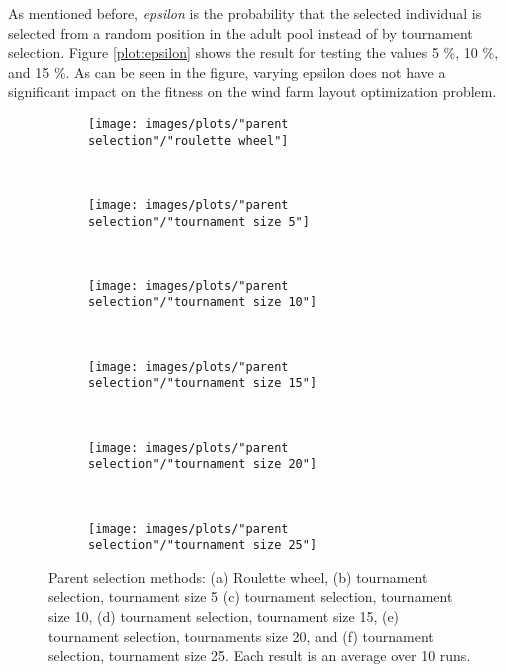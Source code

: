 \noindent As mentioned before, \textit{epsilon} is the probability that the selected individual is selected from a random position in the adult pool instead of by tournament selection. Figure \ref{plot:epsilon} shows the result for testing the values 5 \%, 10 \%, and 15 \%. As can be seen in the figure, varying epsilon does not have a significant impact on the fitness on the wind farm layout optimization problem.\\


\begin{figure}[h!]
    \centering
    \begin{subfigure}[b]{0.31\textwidth}
        \texttt{[image: images/plots/"parent selection"/"roulette wheel"]}
        \caption{}
        \hfill
        \label{plot:roulette wheel}
    \end{subfigure}
    ~
    \begin{subfigure}[b]{0.31\textwidth}
        \texttt{[image: images/plots/"parent selection"/"tournament size 5"]}
        \caption{}
        \hfill
        \label{plot:tournament size 5}
    \end{subfigure}
    ~
       \begin{subfigure}[b]{0.31\textwidth}
        \texttt{[image: images/plots/"parent selection"/"tournament size 10"]}
        \caption{}
        \hfill
        \label{plot:tournament size 10}
    \end{subfigure}
    ~
       \begin{subfigure}[b]{0.31\textwidth}
        \texttt{[image: images/plots/"parent selection"/"tournament size 15"]}
        \caption{}
        \hfill
        \label{plot:tournament size 15}
    \end{subfigure}
    ~
       \begin{subfigure}[b]{0.31\textwidth}
        \texttt{[image: images/plots/"parent selection"/"tournament size 20"]}
        \caption{}
        \hfill
        \label{plot:tournament size 20}
    \end{subfigure}
    ~
    \begin{subfigure}[b]{0.31\textwidth}
        \texttt{[image: images/plots/"parent selection"/"tournament size 25"]}
        \caption{}
        \hfill
        \label{plot:tournament size 25}
    \end{subfigure}
    \caption{Parent selection methods: (a) Roulette wheel, (b) tournament selection, tournament size 5 (c) tournament selection, tournament size 10, (d) tournament selection, tournament size 15, (e) tournament selection, tournaments size 20, and (f) tournament selection, tournament size 25. Each result is an average over 10 runs.}
    \label{plot:parent selection}
\end{figure}


